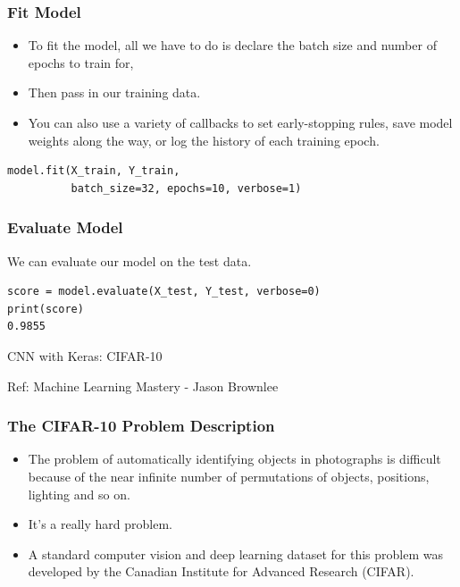 \begin{frame}[fragile] \frametitle{Fit Model}

\begin{itemize}
\item To fit the model, all we have to do is declare the batch size and number of epochs to train for,
\item Then pass in our training data.
\item You can also use a variety of callbacks to set early-stopping rules, save model weights along the way, or log the history of each training epoch.
\end{itemize}
\begin{lstlisting}
model.fit(X_train, Y_train,
          batch_size=32, epochs=10, verbose=1)
\end{lstlisting}
\end{frame}

\begin{frame}[fragile] \frametitle{Evaluate Model}
We can evaluate our model on the test data.
\begin{lstlisting}
score = model.evaluate(X_test, Y_test, verbose=0)
print(score)
0.9855
\end{lstlisting}

\end{frame}



\begin{frame}
  \begin{center}
    {\Large CNN with Keras: CIFAR-10}
    
    {Ref: Machine Learning Mastery - Jason Brownlee}
  \end{center}
\end{frame}

\begin{frame}[fragile] \frametitle{The CIFAR-10 Problem Description}
\begin{itemize}
\item The problem of automatically identifying objects in photographs is difficult because of the near infinite number of permutations of objects, positions, lighting and so on. 
\item It's a really hard problem.
\item  A standard computer vision and deep learning dataset for this problem was developed by the Canadian Institute for Advanced Research (CIFAR).
\end{itemize}
\end{frame}



